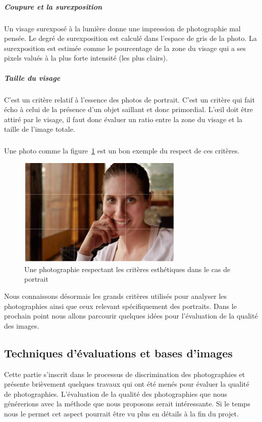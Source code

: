 \documentclass[11pt, french,screen]{report-rd-info}
\begin{document}
\subparagraph{Coupure et la surexposition} Un visage surexposé à la lumière donne une impression de photographie mal pensée. Le degré de  surexposition est calculé dans l’espace de gris de la photo. La surexposition est estimée comme le pourcentage de la zone du visage qui a ses pixels valués à la plus forte intensité (les plus clairs).
\subparagraph{Taille du visage} C'est un critère relatif à l’essence des photos de portrait. C'est un critère qui fait écho à celui de la présence d'un objet saillant et donc primordial. L’œil doit être attiré par le visage, il faut donc évaluer un ratio entre la zone du visage et la taille de l’image totale.
\subparagraph*{}
Une photo comme la figure~\ref{fig:VisageAgreable} est un bon exemple du respect de ces critères.
\begin{figure}
	\centering
	\includegraphics[width=0.7\textwidth]{Images/ea_visageagreable}
	\caption{Une photographie respectant les critères esthétiques dans le cas de portrait \cite{Males2013}}
	\label{fig:VisageAgreable}
\end{figure}
Nous connaissons désormais les grands critères utilisés pour analyser les photographies ainsi que ceux relevant spécifiquement des portraits. Dans le prochain point nous allons parcourir quelques idées pour l'évaluation de la qualité des images.
\subsection{Techniques d’évaluations et bases d’images}
\label{part:PointEvaluation}
Cette partie s’inscrit dans le processus de discrimination des photographies et présente brièvement quelques travaux qui ont été menés pour évaluer la qualité de photographies. L’évaluation de la qualité des photographies que nous générerions avec la méthode que nous proposons serait intéressante. Si le temps nous le permet cet aspect pourrait être vu plus en détails à la fin du projet.
\end{document}
